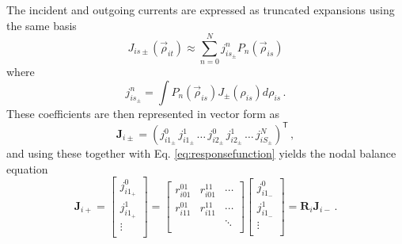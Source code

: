 The incident and outgoing currents are expressed as
truncated expansions using the same basis
\begin{equation}
  J_{is\pm}(\vec{\rho}_{it}) \approx \sum^{N}_{n=0}  
    j^n_{is_\pm} P_n (\vec{\rho}_{is}) 
\end{equation}
where
\begin{equation}
      j^n_{is_\pm} = \int  P_n (\vec{\rho}_{is}) 
        J_{\pm} (\rho_{is}) d \rho_{is} \, .
\end{equation}
These coefficients are then represented in vector form as
\begin{equation}
  \mathbf{J}_{i\pm} = ( j^0_{i1_\pm} \, j^1_{i1_\pm} \, \ldots \, 
    j^0_{i2_\pm} \, j^1_{i2_\pm} \, \ldots \, j^N_{iS_\pm} )^\mathsf{T} \, ,
\end{equation}
and using these together with Eq. \ref{eq:responsefunction} yields
the nodal balance equation
\begin{equation}
    \mathbf{J}_{i+} = \left [\begin{array}{c}
      j^0_{i1_+}    \\
      j^1_{i1_+}    \\
      \vdots        \\
    \end{array} 
    \right ] = \left [\begin{array}{ccc}
       r^{01}_{i01} &  r^{11}_{i01}  &  \cdots   \\
       r^{01}_{i11} &  r^{11}_{i11}  &  \cdots   \\
                    &                &  \ddots   \\
    \end{array} 
    \right ] \left [\begin{array}{c}
      j^0_{i1_-}       \\
      j^1_{i1_-}       \\
      \vdots           \\
    \end{array} 
    \right ] = \mathbf{R}_i\mathbf{J}_{i-} \, .
  \label{eq:elementresponse}
\end{equation}

